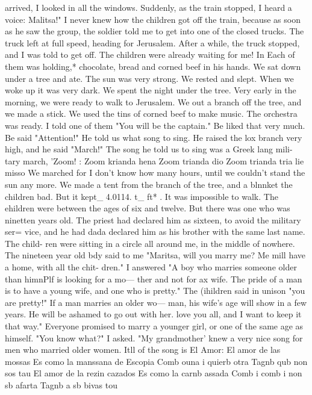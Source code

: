 arrived, I looked in all the windows. Suddenly, as the train stopped, I heard a voice: 
Malitsa!" I never knew how the children got off the train, because as soon as he saw the 
group, the soldier told me to get into one of the closed trucks. The truck left at full 
speed, heading for Jerusalem. 
After a while, the truck stopped, and I was told to get off. The children were already 
waiting for me! In Each of them was holding,* chocolate, bread and corned beef in his hands. 
We sat down under a tree and ate. The sun was very strong. We rested and slept. When we 
woke up it was very dark. We spent the night under the tree. Very early in the morning, 
we were ready to walk to Jerusalem. 
We out a branch off the tree, and we made a stick. We used the tins of corned beef to 
make music. The orchestra was ready. I told one of them "You will be the captain." Be 
liked that very much. Be said "Attention!" He told us what song to sing. He raised the lox 
branch very high, and he said "March!" The song he told us to sing was a Greek lang mili-
tary march, 'Zoom! : 
Zoom krianda hena 
Zoom trianda dio 
Zoom trianda tria 
lie misso 
We marched for I don't know how many hours, until we couldn't stand the sun any more. 
We made a tent from the branch of the tree, and a blnnket the children bad. But it kept_ 
4.0114. 
t_ ft* 
. 
It was impossible to walk. 
The ehildren were between the ages of six and twelve. But there was one who was 
ninetten years old. The priest had declared him as sixteen, to avoid the military ser= 
vice, and he had dada declared him as his brother with the same last name. The child-
ren were sitting in a circle all around me, in the middle of nowhere. The nineteen year 
old bdy said to me "Maritsa, will you marry me? Me mill have a home, with all the chit- 
dren." I answered "A boy who marries someone older than himnPlf is looking for a mo— 
ther and not for ax wife. The pride of a man is to have a young wife, and one who is 
pretty." The (ihildren said in unison "you are pretty!" If a man marries an older wo— 
man, his wife's age will show in a few years. He will be ashamed to go out with her. 
love you all, and I want to keep it that way." Everyone promised to marry a younger 
girl, or one of the same age as himself. "You know what?" I asked. "My grandmother' 
knew a very nice song for men who married older women. Itll 
of the song is El Amor: 
El amor de las mossas 
Es como la manssana de Escopia 
Comb ouna i quierb otra 
Tagnb qub non sos tau 
El amor de la rezin cazados 
Es como la carnb assada 
Comb i comb i non sb afarta 
Tagnb a sb bivas tou 
